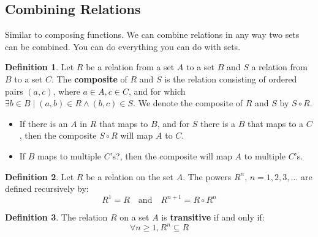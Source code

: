 \documentclass[article, 12pt]{article}
\theoremstyle{definition}
\newtheorem{definition}{Definition}[subsection]
\newcommand{\comp}{\circ} %
\begin{document}
    \subsection{Combining Relations}
    Similar to composing functions. We can combine relations in any way two sets can be combined. You can do everything you can do with sets. 
    \begin{definition}
        Let $R$ be a relation from a set $A$ to a set $B$ and $S$ a relation from $B$ to a set $C$. The \textbf{composite} of $R$ and $S$ is the relation consisting of ordered pairs $(a,c)$, where $a \in A, c \in C$, and for which $\exists b \in B \mid (a,b) \in R \land (b,c) \in S$. We denote the composite of $R$ and $S$ by $S \comp R$.
    \end{definition}
    \begin{itemize}
        \item If there is an $A$ in $R$ that maps to $B$, and for $S$ there is a $B$ that maps to a $C$, then the composite $S \comp R$ will map $A$ to $C$.
        \item If $B$ maps to multiple $C$'s?, then the composite will map $A$ to multiple $C$'s.
    \end{itemize}
    \begin{definition}
    \label{def:reflexive powers}
        Let $R$ be a relation on the set $A$. The powers $R^n$, $n=1,2,3,\dots$ are defined recursively by:
        \begin{equation}
            R^1 = R \quad \text{and} \quad R^{n+1} = R \comp R^n
        \end{equation}
    \end{definition}
    \begin{definition}
        The relation $R$ on a set $A$ is \textbf{transitive} if and only if: 
    \begin{equation}
        \forall n \geq 1, R^n \subseteq R
    \end{equation}
    \end{definition}
\end{document}
